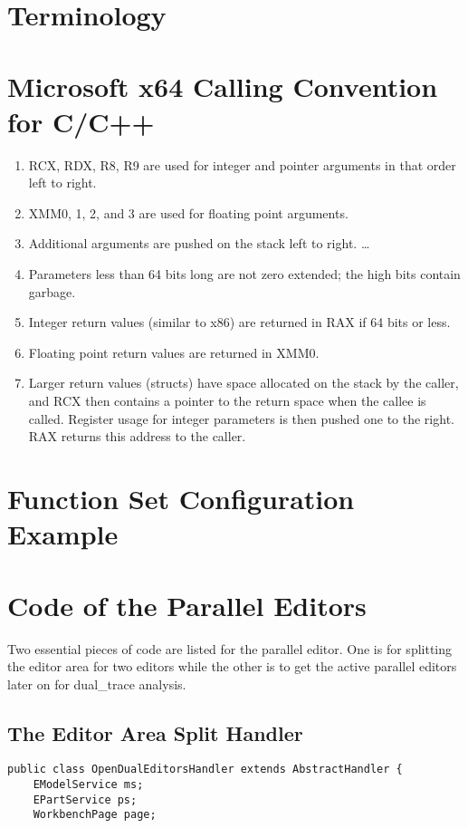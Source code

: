 \begin{appendices}
\chapter{Terminology}\label{term}
\begin{enumerate}  
\chapter{Microsoft x64 Calling Convention for C/C++}\label{convention}
\begin{enumerate}  
\item RCX, RDX, R8, R9 are used for integer and pointer arguments in that order left to right.
\item XMM0, 1, 2, and 3 are used for floating point arguments.
\item Additional arguments are pushed on the stack left to right. \ldots 
\item Parameters less than 64 bits long are not zero extended; the high bits contain garbage.
\item Integer return values (similar to x86) are returned in RAX if 64 bits or less.
\item Floating point return values are returned in XMM0.
\item Larger return values (structs) have space allocated on the stack by the caller, and RCX then contains a pointer to the return space when the callee is called. Register usage for integer parameters is then pushed one to the right. RAX returns this address to the caller.
\end{enumerate}

\chapter{Function Set Configuration Example}\label{funcset}


\chapter{Code of the Parallel Editors}\label{paralleleditor}
Two essential pieces of code are listed for the parallel editor. One is for splitting the editor area for two editors while the other is to get the active parallel editors later on  for dual\_trace analysis.
\section{The Editor Area Split Handler}
\begin{lstlisting}[caption= code in OpenDualEditorsHandler.java]
public class OpenDualEditorsHandler extends AbstractHandler {
	EModelService ms;
	EPartService ps;
	WorkbenchPage page;


\end{lstlisting}
\end{enumerate}
\end{appendices}
